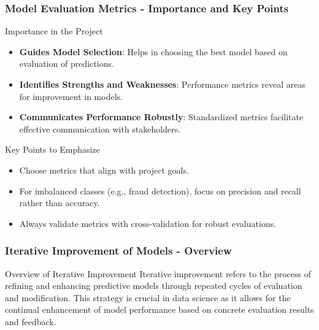 \documentclass[aspectratio=169]{beamer}
\begin{document}
\begin{frame}[fragile]
    \frametitle{Model Evaluation Metrics - Importance and Key Points}
    \begin{block}{Importance in the Project}
        \begin{itemize}
            \item \textbf{Guides Model Selection}: Helps in choosing the best model based on evaluation of predictions.
            \item \textbf{Identifies Strengths and Weaknesses}: Performance metrics reveal areas for improvement in models.
            \item \textbf{Communicates Performance Robustly}: Standardized metrics facilitate effective communication with stakeholders.
        \end{itemize}
    \end{block}

    \begin{block}{Key Points to Emphasize}
        \begin{itemize}
            \item Choose metrics that align with project goals.
            \item For imbalanced classes (e.g., fraud detection), focus on precision and recall rather than accuracy.
            \item Always validate metrics with cross-validation for robust evaluations.
        \end{itemize}
    \end{block}
\end{frame}

\begin{frame}[fragile]
  \frametitle{Iterative Improvement of Models - Overview}
  \begin{block}{Overview of Iterative Improvement}
    Iterative improvement refers to the process of refining and enhancing predictive models through repeated cycles of evaluation and modification. This strategy is crucial in data science as it allows for the continual enhancement of model performance based on concrete evaluation results and feedback.
  \end{block}
\end{frame}
\end{document}
